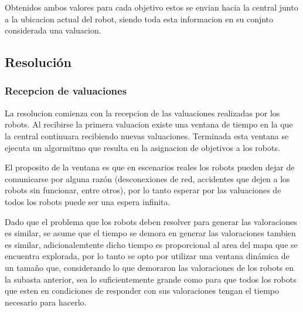 Obtenidos ambos valores para cada objetivo estos se envian hacia la central
junto a la ubicacion actual del robot, siendo toda esta informacion en su
conjnto considerada una valuacion. 




\subsection{Resolución} \label{subsec:MiResSub}

\subsubsection{Recepcion de valuaciones}
La resolucion comienza con la recepcion de las valuaciones realizadas por
los robots. Al recibirse la primera valuacion existe una ventana de tiempo en
la que la central continuara recibiendo nuevas valuaciones. Terminada esta
ventana se ejecuta un algormitmo que resulta en la asignacion de objetivos a
los robots.

El proposito de la ventana es que en escenarios reales los robots pueden dejar
de comunicarse por alguna razón (desconexiones de red, accidentes que dejen a
los robots sin funcionar, entre otros), por lo tanto esperar por las
valuaciones de todos los robots puede ser una espera infinita.

Dado que el problema que los robots deben resolver para generar las valoraciones es
similar, se asume que el tiempo se demora en generar las valoraciones tambien
es similar, adicionalemtente dicho tiempo es proporcional al area del
mapa que se encuentra explorada, por lo tanto se opto por utilizar una ventana
dinámica de un tamaño que, considerando lo que demoraron las valoraciones de
los robots en la subasta anterior, sea lo suficientemente grande como para que
todos los robots que esten en condiciones de responder con sus valoraciones
tengan el tiempo necesario para hacerlo.

